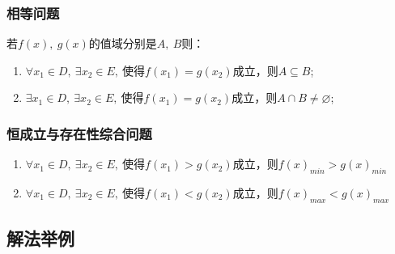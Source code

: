\subsubsection{相等问题}
{\kaishu \large \noindent 若$f(x),~g(x)$的值域分别是$ A,~B $则：}
\begin{enumerate}[1)]
\item $\forall x_1\in D,~$$\exists x_2\in E,~$使得$ f(x_1)=g(x_2) $成立，则$ A\subseteq B $;
\item $\exists x_1\in D,~$$\exists x_2\in E,~$使得$ f(x_1)=g(x_2) $成立，则$ A\cap B\ne \varnothing $;
\end{enumerate}
\subsubsection{恒成立与存在性综合问题}
\begin{enumerate}[1)]
\item $\forall x_1\in D,~$$\exists x_2 \in E,~$使得$f(x_1)>g(x_2) $成立，则$ f(x)_{min}>g(x)_{min} $
\item $\forall x_1\in D,~$$\exists x_2 \in E,~$使得$ f(x_1)<g(x_2) $成立，则$ f(x)_{max}<g(x)_{max} $
\end{enumerate}
\subsection{解法举例}
